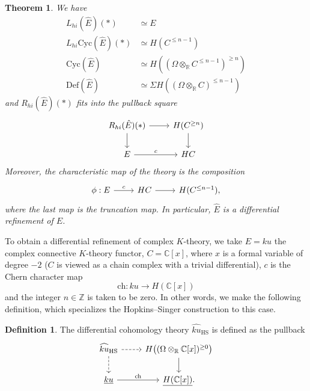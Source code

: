 \documentclass[a4paper]{book}
\newcommand{\bC}{\mathbb{C}}
\newcommand{\bR}{\mathbb{R}}
\newcommand{\bZ}{\mathbb{Z}}
\newcommand{\ch}{\mathrm{ch}}
\newtheorem{theorem}[equation]{Theorem}
\theoremstyle{definition}
\newtheorem{definition}[equation]{Definition}
\theoremstyle{remark}
\numberwithin{equation}{section}
\begin{document}
\begin{theorem}\cite[Thm.~4.7]{bunkenikolausvoelkl2016diffcoh}
\label{DiffRefinementThm}
We have
\begin{align*}
	L_{hi}(\hat{E})(*)
	&\simeq E
	\\
	L_{hi}\mathrm{Cyc}(\hat{E})(*) &\simeq H(C^{\leq n-1})
	\\
	\mathrm{Cyc}(\hat{E}) 
	&\simeq H((\Omega \otimes_\bR C^{\leq n-1})^{\geq n})
	\\
	\mathrm{Def}(\hat{E})
	&\simeq \Sigma H((\Omega \otimes_\bR C)^{\leq n-1})
\end{align*}
and $R_{hi}(\hat{E})(*)$ fits into the pullback square
\[
\begin{tikzcd}
	R_{hi}(\hat{E})(*)
	\ar[r]
	\ar[d] &
	H(C^{\geq n})
	\ar[d]
	\\
	E \ar[r, "c"] & HC
\end{tikzcd}
\]
Moreover, the characteristic map of the theory is the composition
\[
\begin{tikzcd}
\phi : E \ar[r, "c"] & HC \ar[r] & H(C^{\leq n-1}),
\end{tikzcd}
\]
where the last map is the truncation map. In particular, $\hat{E}$ is a differential refinement of $E$. 
\end{theorem}

To obtain a differential refinement of complex $K$-theory, we take $E = ku$ the complex connective $K$-theory functor, $C = \bC[x]$, where $x$ is a formal variable of degree $-2$ ($C$ is viewed as a chain complex with a trivial differential), $c$ is the Chern character map
\[
\ch : ku \longrightarrow H(\bC[x])
\]
and the integer $n \in \bZ$ is taken to be zero. In other words, we make the following definition, which specializes the Hopkins--Singer construction to this case.

\begin{definition}
The differential cohomology theory 	$\widehat{ku}_{\mathrm{HS}}$ is defined as the pullback
\[
\begin{tikzcd}
\widehat{ku}_{\mathrm{HS}}
\ar[r, dashed] 
\ar[d, dashed]
&
H\bigl((\Omega \otimes_\bR \bC[x])^{\geq 0}\bigr)
\ar[d]
\\
\underline{ku} \ar[r, "\ch"] 
& 
\underline{H(\bC[x])}.
\end{tikzcd}
\]
\end{definition}
\end{document}
